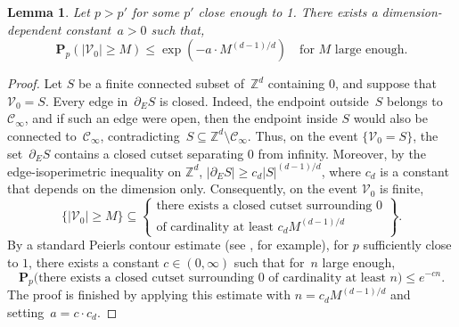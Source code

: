 \documentclass[a4paper,11pt]{article}
\newtheorem{lemma}{Lemma}
\theoremstyle{definition}
\begin{document}
\begin{lemma}\label{lem:size_cluster_origin_complment_infinitecomponent}
Let $p>p'$ for some $p'$ close enough to 1. There exists a dimension-dependent constant~$a>0$ such that,
    \begin{equation}
        \mathbf{P}_p (|\mathcal{V}_0|\ge M) \le \exp(- a \cdot M^{(d-1)/d} ) \quad \text{for } M \text{ large enough.} 
    \end{equation}
\end{lemma}
\begin{proof}
Let $S$ be a finite connected subset of~$\mathbb Z^d$ containing $0$, and suppose
that~$\mathcal V_0=S$. Every edge in~$\partial_{E} S$ is closed. Indeed, the endpoint outside~$S$ belongs to~$\mathcal C_\infty$, and if such an edge were open, then the endpoint inside $S$ would also be connected to~$\mathcal C_\infty$, contradicting~$S\subseteq \mathbb Z^d\setminus \mathcal C_\infty$. Thus, on the event $\{\mathcal V_0=S\}$, the set~$\partial_{E}S$
contains a closed cutset separating $0$ from infinity. Moreover, by the
edge-isoperimetric inequality on $\mathbb Z^d$,
$|\partial_{E} S|
    \ge c_d |S|^{(d-1)/d}$, where $c_d$ is a constant that depends on the dimension only. Consequently, on the event $\mathcal V_0$ is finite, 
\[
    \{|\mathcal V_0|\ge M\}
    \subseteq
    \left\{
    \begin{array}{c}
    \text{there exists a closed cutset surrounding }0\\
    \text{of cardinality at least } c_d M^{(d-1)/d}
    \end{array}
    \right\}.
\]
By a standard Peierls contour estimate (see \cite[section 1.4]{grimmett1999percolation}, for example), for $p$ sufficiently close to $1$,
there exists a constant $c \in(0,\infty)$ such that for~$n$ large enough,
\begin{equation}
    \mathbf P_p\big(
     \text{there exists a closed cutset surrounding }0
    \text{ of cardinality at least } n
    \big)
    \le e^{-c n}.
\end{equation}
The proof is finished by applying this estimate with $n=c_d M^{(d-1)/d}$ and setting~$a = c \cdot c_d$.


\end{proof}
\end{document}
